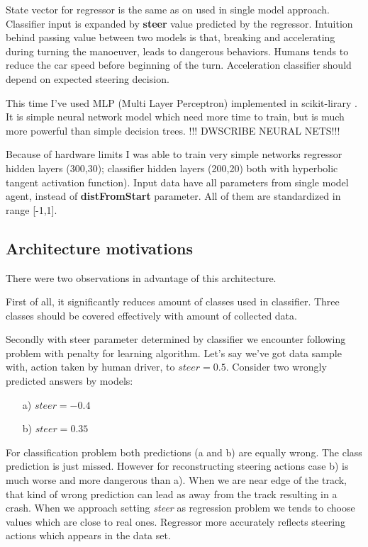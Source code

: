 \documentclass[declaration,shortabstract,english,inz]{iithesis}
\begin{document}
State vector for regressor is the same as on used in single model approach. Classifier input is expanded by \textbf{steer} value predicted by the regressor. Intuition behind passing value between two models is that, breaking and accelerating during turning the manoeuver, leads to dangerous behaviors. Humans tends to reduce the car speed before beginning of the turn. Acceleration classifier should depend on expected steering decision.


This time I've used MLP (Multi Layer Perceptron) implemented in scikit-lirary \cite{scikit_learn}. It is simple neural network model which need more time to train, but is much more powerful than simple decision trees. 
!!! DWSCRIBE NEURAL NETS!!!

Because of hardware limits I was able to train very simple networks regressor hidden layers (300,30); classifier hidden layers (200,20) both with hyperbolic tangent activation function). Input data have all parameters from single model agent, instead of \textbf{distFromStart} parameter. All of them are standardized in range [-1,1].

\subsection{Architecture motivations}

There were two observations in advantage of this architecture. 

First of all, it significantly reduces amount of classes used in classifier. Three classes should be covered effectively with amount of collected data.

Secondly with steer parameter determined by classifier we encounter following problem with penalty for learning algorithm. Let's say we've got data sample with, action taken by human driver, to $steer=0.5$. Consider two wrongly predicted answers by models:
\begin{itemize}
    \item[a)] $steer=-0.4$
    \item[b)] $steer=0.35$
\end{itemize}

For classification problem both predictions (a and b) are equally wrong.  The class prediction is just missed. However for reconstructing steering actions case b) is much worse and more dangerous than a). When we are near edge of the track, that kind of wrong prediction can lead as away from the track resulting in a crash. When we approach setting \textit{steer} as regression problem we tends to choose values which are close to real ones. Regressor more accurately reflects steering actions which appears in the data set.
\end{document}
